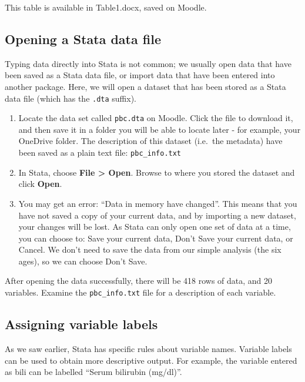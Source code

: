\documentclass[
]{memoir}
\providecommand{\tightlist}{%
  \setlength{\itemsep}{0pt}\setlength{\parskip}{0pt}}
\begin{document}
This table is available in Table1.docx, saved on Moodle.

\hypertarget{opening-a-stata-data-file}{%
\subsection{Opening a Stata data file}\label{opening-a-stata-data-file}}

Typing data directly into Stata is not common; we usually open data that have been saved as a Stata data file, or import data that have been entered into another package. Here, we will open a dataset that has been stored as a Stata data file (which has the \texttt{.dta} suffix).

\begin{enumerate}
\def\labelenumi{\arabic{enumi}.}
\tightlist
\item
  Locate the data set called \texttt{pbc.dta} on Moodle. Click the file to download it, and then save it in a folder you will be able to locate later - for example, your OneDrive folder. The description of this dataset (i.e.~the metadata) have been saved as a plain text file: \texttt{pbc\_info.txt}
\item
  In Stata, choose \textbf{File \textgreater{} Open}. Browse to where you stored the dataset and click \textbf{Open}.
\item
  You may get an error: ``Data in memory have changed''. This means that you have not saved a copy of your current data, and by importing a new dataset, your changes will be lost. As Stata can only open one set of data at a time, you can choose to: Save your current data, Don't Save your current data, or Cancel. We don't need to save the data from our simple analysis (the six ages), so we can choose Don't Save.
\end{enumerate}

After opening the data successfully, there will be 418 rows of data, and 20 variables. Examine the \texttt{pbc\_info.txt} file for a description of each variable.

\hypertarget{assigning-variable-labels}{%
\subsection{Assigning variable labels}\label{assigning-variable-labels}}

As we saw earlier, Stata has specific rules about variable names. Variable labels can be used to obtain more descriptive output. For example, the variable entered as bili can be labelled ``Serum bilirubin (mg/dl)''.
\end{document}
